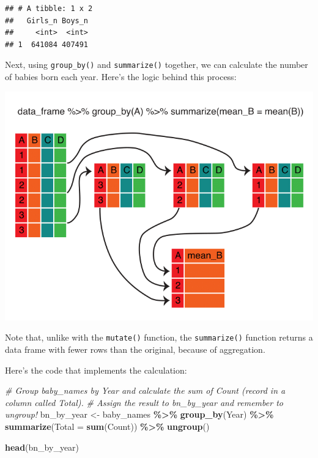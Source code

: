 \documentclass[
]{book}
\newenvironment{Shaded}{\begin{snugshade}}{\end{snugshade}}
\newcommand{\CommentTok}[1]{\textcolor[rgb]{0.56,0.35,0.01}{\textit{#1}}}
\newcommand{\DataTypeTok}[1]{\textcolor[rgb]{0.13,0.29,0.53}{#1}}
\newcommand{\KeywordTok}[1]{\textcolor[rgb]{0.13,0.29,0.53}{\textbf{#1}}}
\newcommand{\NormalTok}[1]{#1}
\newcommand{\OperatorTok}[1]{\textcolor[rgb]{0.81,0.36,0.00}{\textbf{#1}}}
\newcommand{\StringTok}[1]{\textcolor[rgb]{0.31,0.60,0.02}{#1}}
\begin{document}
\begin{verbatim}
## # A tibble: 1 x 2
##   Girls_n Boys_n
##     <int>  <int>
## 1  641084 407491
\end{verbatim}

Next, using \texttt{group\_by()} and \texttt{summarize()} together, we can calculate the
number of babies born each year. Here's the logic behind this process:

\includegraphics{R/Rintro/images/summarize_group_by.png}

Note that, unlike with the \texttt{mutate()} function, the \texttt{summarize()} function returns a data frame
with fewer rows than the original, because of aggregation.

Here's the code that implements the calculation:

\begin{Shaded}
\begin{Highlighting}[]
\CommentTok{\# Group baby\_names by Year and calculate the sum of Count (record in a column called Total). }
\CommentTok{\# Assign the result to bn\_by\_year and remember to ungroup!}
\NormalTok{bn\_by\_year \textless{}{-}}
\StringTok{  }\NormalTok{baby\_names }\OperatorTok{\%\textgreater{}\%}
\StringTok{  }\KeywordTok{group\_by}\NormalTok{(Year) }\OperatorTok{\%\textgreater{}\%}
\StringTok{  }\KeywordTok{summarize}\NormalTok{(}\DataTypeTok{Total =} \KeywordTok{sum}\NormalTok{(Count)) }\OperatorTok{\%\textgreater{}\%}
\StringTok{  }\KeywordTok{ungroup}\NormalTok{()}

\KeywordTok{head}\NormalTok{(bn\_by\_year)}
\end{Highlighting}
\end{Shaded}
\end{document}
